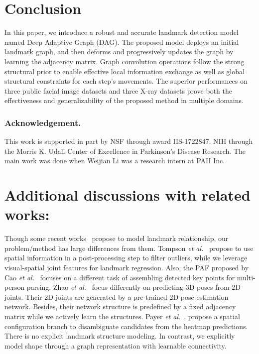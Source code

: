 \documentclass[runningheads]{llncs}
\begin{document}
\section{Conclusion} In this paper, we introduce a robust and accurate landmark detection model named Deep Adaptive Graph (DAG). The proposed model deploys an initial landmark graph, and then deforms and progressively updates the graph by learning the adjacency matrix. Graph convolution operations follow the strong structural prior to enable effective local information exchange as well as global structural constraints for each step's movements. The superior performances on three public facial image datasets and three X-ray datasets prove both the effectiveness and generalizability of the proposed method in multiple domains.

\subsubsection{Acknowledgement.} This work is supported in part by NSF through award IIS-1722847, NIH through the Morris K. Udall Center of Excellence in Parkinson's Disease Research. The main work was done when Weijian Li was a research intern at PAII Inc.

\newpage
\section{Additional discussions with related works:} 
Though some recent works~\cite{tompson2014joint,cao2017realtime,Payer2019a} propose to model landmark relationship, our problem/method has large differences from them. Tompson \textit{et al.}~\cite{tompson2014joint} propose to use spatial information in a post-processing step to filter outliers, while we leverage visual-spatial joint features for landmark regression. Also, the PAF proposed by Cao \textit{et al.}~\cite{cao2017realtime} focuses on a different task of assembling detected key points for multi-person parsing. Zhao \textit{et al.}~\cite{zhao2019semantic} focus differently on predicting 3D poses from 2D joints. Their 2D joints are generated by a pre-trained 2D pose estimation network. Besides, their network structure is predefined by a fixed adjacency matrix while we actively learn the structures. Payer \textit{et al.}~\cite{Payer2019a}, propose a spatial configuration branch to disambiguate candidates from the heatmap predictions. There is no explicit landmark structure modeling. In contrast, we explicitly model shape through a graph representation with learnable connectivity.
\end{document}
